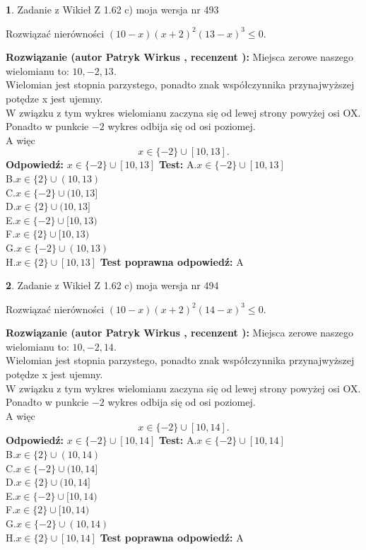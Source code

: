 \documentclass[12pt, a4paper]{article}
\theoremstyle{definition} %
\newtheorem{zad}{}
\newcommand{\zadStart}[1]{\begin{zad}#1\newline}
\newcommand{\zadStop}{\end{zad}}
\newcommand{\rozwStart}[2]{\noindent \textbf{Rozwiązanie (autor #1 , recenzent #2): }\newline}
\newcommand{\rozwStop}{\newline}
\newcommand{\odpStart}{\noindent \textbf{Odpowiedź:}\newline}
\newcommand{\odpStop}{\newline}
\newcommand{\testStart}{\noindent \textbf{Test:}\newline}
\newcommand{\testStop}{\newline}
\newcommand{\kluczStart}{\noindent \textbf{Test poprawna odpowiedź:}\newline}
\newcommand{\kluczStop}{\newline}
\begin{document}
\zadStart{Zadanie z Wikieł Z 1.62 c) moja wersja nr 493}

Rozwiązać nierówności $(10-x)(x+2)^{2}(13-x)^{3}\le0$.
\zadStop
\rozwStart{Patryk Wirkus}{}
Miejsca zerowe naszego wielomianu to: $10, -2, 13$.\\
Wielomian jest stopnia parzystego, ponadto znak współczynnika przy\linebreak najwyższej potędze x jest ujemny.\\ W związku z tym wykres wielomianu zaczyna się od lewej strony powyżej osi OX.\\
Ponadto w punkcie $-2$ wykres odbija się od osi poziomej.\\
A więc $$x \in \{-2\} \cup [10,13].$$
\rozwStop
\odpStart
$x \in \{-2\} \cup [10,13]$
\odpStop
\testStart
A.$x \in \{-2\} \cup [10,13]$\\
B.$x \in \{2\} \cup (10,13)$\\
C.$x \in \{-2\} \cup (10,13]$\\
D.$x \in \{2\} \cup (10,13]$\\
E.$x \in \{-2\} \cup [10,13)$\\
F.$x \in \{2\} \cup [10,13)$\\
G.$x \in \{-2\} \cup (10,13)$\\
H.$x \in \{2\} \cup [10,13]$
\testStop
\kluczStart
A
\kluczStop



\zadStart{Zadanie z Wikieł Z 1.62 c) moja wersja nr 494}

Rozwiązać nierówności $(10-x)(x+2)^{2}(14-x)^{3}\le0$.
\zadStop
\rozwStart{Patryk Wirkus}{}
Miejsca zerowe naszego wielomianu to: $10, -2, 14$.\\
Wielomian jest stopnia parzystego, ponadto znak współczynnika przy\linebreak najwyższej potędze x jest ujemny.\\ W związku z tym wykres wielomianu zaczyna się od lewej strony powyżej osi OX.\\
Ponadto w punkcie $-2$ wykres odbija się od osi poziomej.\\
A więc $$x \in \{-2\} \cup [10,14].$$
\rozwStop
\odpStart
$x \in \{-2\} \cup [10,14]$
\odpStop
\testStart
A.$x \in \{-2\} \cup [10,14]$\\
B.$x \in \{2\} \cup (10,14)$\\
C.$x \in \{-2\} \cup (10,14]$\\
D.$x \in \{2\} \cup (10,14]$\\
E.$x \in \{-2\} \cup [10,14)$\\
F.$x \in \{2\} \cup [10,14)$\\
G.$x \in \{-2\} \cup (10,14)$\\
H.$x \in \{2\} \cup [10,14]$
\testStop
\kluczStart
A
\kluczStop
\end{document}
